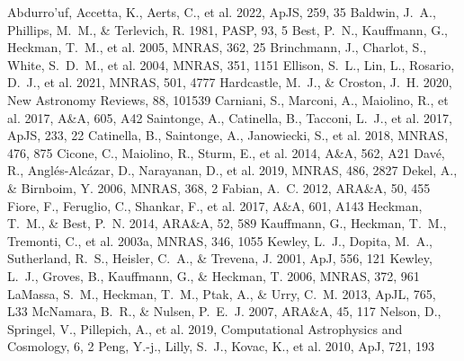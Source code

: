 \documentclass[twocolumn]{aastex631}
\begin{document}

\begin{thebibliography}{}
 Abdurro'uf, Accetta, K., Aerts, C., et al. 2022, ApJS, 259, 35
 Baldwin, J.~A., Phillips, M.~M., \& Terlevich, R. 1981, PASP, 93, 5
 Best, P.~N., Kauffmann, G., Heckman, T.~M., et al. 2005, MNRAS, 362, 25
 Brinchmann, J., Charlot, S., White, S.~D.~M., et al. 2004, MNRAS, 351, 1151
 Ellison, S.~L., Lin, L., Rosario, D.~J., et al. 2021, MNRAS, 501, 4777
 Hardcastle, M.~J., \& Croston, J.~H. 2020, New Astronomy Reviews, 88, 101539
 Carniani, S., Marconi, A., Maiolino, R., et al. 2017, A\&A, 605, A42
 Saintonge, A., Catinella, B., Tacconi, L.~J., et al. 2017, ApJS, 233, 22
 Catinella, B., Saintonge, A., Janowiecki, S., et al. 2018, MNRAS, 476, 875
 Cicone, C., Maiolino, R., Sturm, E., et al. 2014, A\&A, 562, A21
 Dav{\'e}, R., Angl{\'e}s-Alc{\'a}zar, D., Narayanan, D., et al. 2019, MNRAS, 486, 2827
 Dekel, A., \& Birnboim, Y. 2006, MNRAS, 368, 2
 Fabian, A.~C. 2012, ARA\&A, 50, 455
 Fiore, F., Feruglio, C., Shankar, F., et al. 2017, A\&A, 601, A143
 Heckman, T.~M., \& Best, P.~N. 2014, ARA\&A, 52, 589
 Kauffmann, G., Heckman, T.~M., Tremonti, C., et al. 2003a, MNRAS, 346, 1055
 Kewley, L.~J., Dopita, M.~A., Sutherland, R.~S., Heisler, C.~A., \& Trevena, J. 2001, ApJ, 556, 121
 Kewley, L.~J., Groves, B., Kauffmann, G., \& Heckman, T. 2006, MNRAS, 372, 961
 LaMassa, S.~M., Heckman, T.~M., Ptak, A., \& Urry, C.~M. 2013, ApJL, 765, L33
 McNamara, B.~R., \& Nulsen, P.~E.~J. 2007, ARA\&A, 45, 117
 Nelson, D., Springel, V., Pillepich, A., et al. 2019, Computational Astrophysics and Cosmology, 6, 2
 Peng, Y.-j., Lilly, S.~J., Kovac, K., et al. 2010, ApJ, 721, 193

\end{thebibliography}
\end{document}
